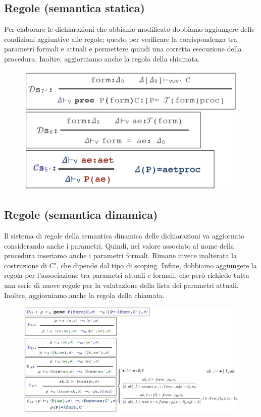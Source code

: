 \documentclass[a4paper,oneside,titlepage]{book}
\begin{document}
\newpage
\subsection{Regole (semantica statica)}
\label{sec:decSemStat3}
Per elaborare le dichiarazioni che abbiamo modificato dobbiamo aggiungere delle condizioni aggiuntive alle regole; questo per verificare la corrispondenza tra parametri formali e attuali e permettere quindi una corretta esecuzione della procedura. Inoltre, aggiorniamo anche la regola della chiamata.
\begin{figure}[htp]
	\centering
	\includegraphics[width=\textwidth, height=\textheight, keepaspectratio]{procRegole3.png}
\end{figure}

\subsection{Regole (semantica dinamica)}
\label{sec:decSemDin3}
Il sistema di regole della semantica dinamica delle dichiarazioni va aggiornato considerando anche i parametri. Quindi, nel valore associato al nome della procedura inseriamo anche i parametri formali. Rimane invece inalterata la costruzione di $C'$, che dipende dal tipo di scoping. Infine, dobbiamo aggiungere la regola per l'associazione tra parametri attuali e formali, che però richiede tutta una serie di nuove regole per la valutazione della lista dei parametri attuali. Inoltre, aggiorniamo anche la regola della chiamata.
\begin{figure}[htp]
	\centering
	\includegraphics[width=\textwidth, height=\textheight, keepaspectratio]{procRegole4.png}
\end{figure}
\end{document}
